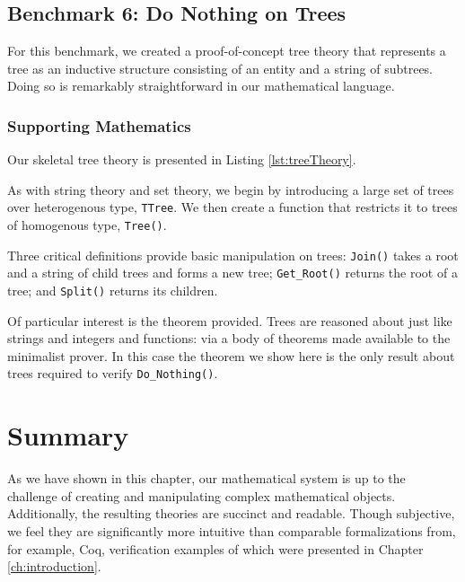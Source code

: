 	\subsection{Benchmark 6: Do Nothing on Trees}	
For this benchmark, we created a proof-of-concept tree theory that represents a tree as an inductive structure consisting of an entity and a string of subtrees.  Doing so is remarkably straightforward in our mathematical language.

		\subsubsection{Supporting Mathematics}

Our skeletal tree theory is presented in Listing \ref{lst:treeTheory}.



As with string theory and set theory, we begin by introducing a large set of trees over heterogenous type, \texttt{TTree}.  We then create a function that restricts it to trees of homogenous type, \texttt{Tree()}.

Three critical definitions provide basic manipulation on trees: \texttt{Join()} takes a root and a string of child trees and forms a new tree; \texttt{Get\_Root()} returns the root of a tree; and \texttt{Split()} returns its children.

Of particular interest is the theorem provided.  Trees are reasoned about just like strings and integers and functions: via a body of theorems made available to the minimalist prover.  In this case the theorem we show here is the only result about trees required to verify \texttt{Do\_Nothing()}.

\section{Summary}
As we have shown in this chapter, our mathematical system is up to the challenge of creating and manipulating complex mathematical objects.  Additionally, the resulting theories are succinct and readable.  Though subjective, we feel they are significantly more intuitive than comparable formalizations from, for example, Coq, verification examples of which were presented in Chapter \ref{ch:introduction}.

